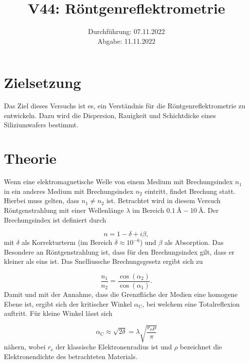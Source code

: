\documentclass[
  bibliography=totoc,     %
  captions=tableheading,  %
  titlepage=firstiscover, %
]{scrartcl}
\title{V44: Röntgenreflektrometrie}
\author{
  Martin Schönfeld
  \texorpdfstring{
    \\
    \href{mailto:martin.schoenfeld@udo.edu}{martin.schoenfeld@udo.edu}
  }{}
  \texorpdfstring{\and}{, }
  Tim Sedlaczek
  \texorpdfstring{
    \\
    \href{mailto:tim.sedlaczek@udo.edu}{tim.sedlaczek@udo.edu}
  }{}
}
\date{Durchführung: 07.11.2022\\
      Abgabe: 11.11.2022}
\begin{document}
\maketitle
\thispagestyle{empty}
\setcounter{page}{1}

\section{Zielsetzung}
\label{sec:Zielsetzung}

Das Ziel dieses Versuchs ist es, ein Verständnis für die Röntgenreflektrometrie zu entwickeln.
Dazu wird die Dispersion, Rauigkeit und Schichtdicke eines Siliziumwafers bestimmt.

\section{Theorie}
\label{sec:Theorie}

Wenn eine elektromagnetische Welle von einem Medium mit Brechungsindex $n_1$ in ein anderes Medium mit 
Brechungsindex $n_2$ eintritt, findet Brechung statt. Hierbei muss gelten, dass $n_1 \neq n_2$ ist. 
Betrachtet wird in diesem Versuch Röntgenstrahlung mit einer Wellenlänge $\lambda$ im Bereich 
$\SI{0.1}{\angstrom}-\SI{10}{\angstrom}$. Der Brechungsindex ist definiert durch

\begin{equation*}
    n = 1-\delta +i\beta,
\end{equation*}
mit $\delta$ als Korrekturterm (im Bereich $\delta \approx 10^{-6}$) und $\beta$ als Absorption. 
Das Besondere an Röntgenstrahlung ist, dass für den Brechungsindex gilt, dass er kleiner als eins ist.
Das Snelliussche Brechungsgesetz ergibt sich zu

\begin{equation*}
    \frac{n_1}{n_2} = \frac{\cos{\left(\alpha_2\right)}}{\cos{\left(\alpha_1\right)}}.
\end{equation*}
Damit und mit der Annahme, dass die Grenzfläche der Medien eine homogene Ebene ist, ergibt sich der kritischer Winkel $\alpha_\text{C}$, 
bei welchem eine Totalreflexion auftritt. Für kleine Winkel lässt sich

\begin{equation*}
    \alpha_\text{C} \approx \sqrt{2\delta} = \lambda \sqrt{\frac{r_\text{e}\rho}{\pi}}
\end{equation*}
nähern, wobei $r_\text{e}$ der klassische Elektronenradius ist und $\rho$ bezeichnet die Elektronendichte des betrachteten Materials. 
\end{document}
